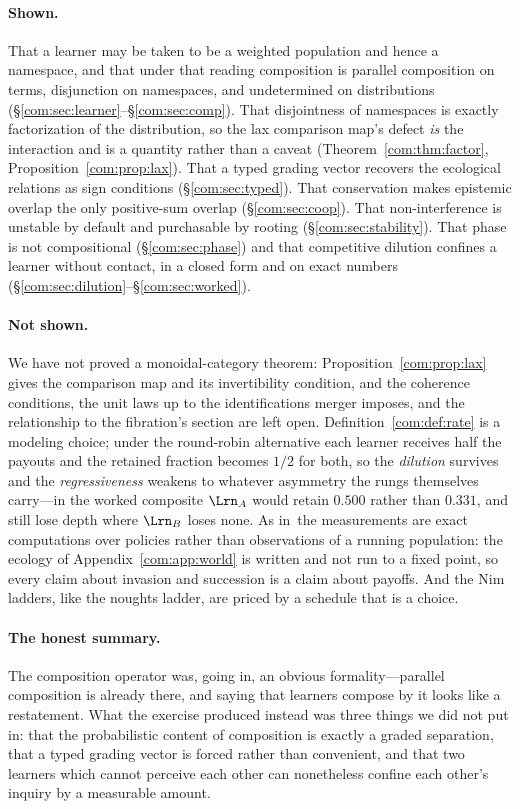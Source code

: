 \paragraph{Shown.}
That a learner may be taken to be a weighted population and hence a namespace, and that under
that reading composition is parallel composition on terms, disjunction on namespaces, and
undetermined on distributions (\S\ref{com:sec:learner}--\S\ref{com:sec:comp}). That disjointness of
namespaces is exactly factorization of the distribution, so the lax comparison map's defect
\emph{is} the interaction and is a quantity rather than a caveat (Theorem~\ref{com:thm:factor},
Proposition~\ref{com:prop:lax}). That a typed grading vector recovers the ecological relations as
sign conditions (\S\ref{com:sec:typed}). That conservation makes epistemic overlap the only
positive-sum overlap (\S\ref{com:sec:coop}). That non-interference is unstable by default and
purchasable by rooting (\S\ref{com:sec:stability}). That phase is not compositional
(\S\ref{com:sec:phase}) and that competitive dilution confines a learner without contact, in a closed
form and on exact numbers (\S\ref{com:sec:dilution}--\S\ref{com:sec:worked}).

\paragraph{Not shown.}
We have not proved a monoidal-category theorem: Proposition~\ref{com:prop:lax} gives the comparison
map and its invertibility condition, and the coherence conditions, the unit laws up to the
identifications merger imposes, and the relationship to the fibration's section are left open.
Definition~\ref{com:def:rate} is a modeling choice; under the round-robin alternative each learner
receives half the payouts and the retained fraction becomes $1/2$ for both, so the
\emph{dilution} survives and the \emph{regressiveness} weakens to whatever asymmetry the rungs
themselves carry---in the worked composite $\Lrn_A$ would retain $0.500$ rather than $0.331$, and
still lose depth where $\Lrn_B$ loses none. As in~\chGame the measurements are exact
computations over policies rather than observations of a running population: the ecology of
Appendix~\ref{com:app:world} is written and not run to a fixed point, so every claim about invasion
and succession is a claim about payoffs. And the Nim ladders, like the noughts ladder, are
priced by a schedule that is a choice.

\paragraph{The honest summary.}
The composition operator was, going in, an obvious formality---parallel composition is already
there, and saying that learners compose by it looks like a restatement. What the exercise
produced instead was three things we did not put in: that the probabilistic content of
composition is exactly a graded separation, that a typed grading vector is forced rather than
convenient, and that two learners which cannot perceive each other can nonetheless confine each
other's inquiry by a measurable amount.

